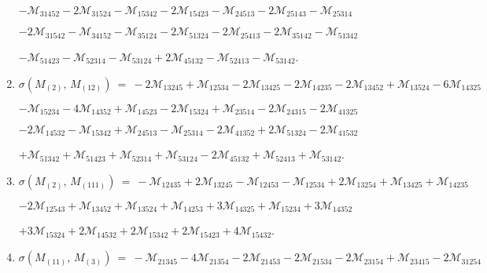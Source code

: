 \documentclass[12pt]{article}
\newcommand{\M}{\mathcal{M}}
\begin{document}
\begin{enumerate}
      \hspace{10pt}
      $-\M_{31452} 
       -2\M_{31524} -\M_{15342} 
       -2\M_{15423} -\M_{24513} 
       -2\M_{25143} -\M_{25314} $\vspace{-6pt}

      \hspace{10pt}
      $-2\M_{31542} -\M_{34152} 
       -\M_{35124} -2\M_{51324} 
       -2\M_{25413} -2\M_{35142} 
       -\M_{51342} $\vspace{-6pt}

      \hspace{10pt}
      $-\M_{51423} 
       -\M_{52314} -\M_{53124} 
       +2\M_{45132} -\M_{52413} 
       -\M_{53142} $.\vspace{-8pt}
\item[]\hspace{-50pt}$\sigma(M_{(2)},\,M_{(12)})\ =\ 
        -2\M_{13245} +\M_{12534} 
       -2\M_{13425} -2\M_{14235} 
       -2\M_{13452} +\M_{13524} 
       -6\M_{14325} $\vspace{-6pt}

      \hspace{10pt}
      $-\M_{15234} 
       -4\M_{14352} +\M_{14523} 
       -2\M_{15324} +\M_{23514} 
       -2\M_{24315} -2\M_{41325} $\vspace{-6pt}

      \hspace{10pt}
      $-2\M_{14532} -\M_{15342} 
       +\M_{24513} -\M_{25314} 
       -2\M_{41352} +2\M_{51324} 
       -2\M_{41532} $\vspace{-6pt}

      \hspace{10pt}
      $+\M_{51342} 
       +\M_{51423} +\M_{52314} 
       +\M_{53124} -2\M_{45132} 
       +\M_{52413} +\M_{53142} $.\vspace{-8pt}
\item[]\hspace{-50pt}$\sigma(M_{(2)},\,M_{(111)})\ =\ 
        -\M_{12435} +2\M_{13245} 
       -\M_{12453} -\M_{12534} 
       +2\M_{13254} +\M_{13425} 
       +\M_{14235} $\vspace{-6pt}

      \hspace{10pt}
      $-2\M_{12543} 
       +\M_{13452} +\M_{13524} 
       +\M_{14253} +3\M_{14325} 
       +\M_{15234} +3\M_{14352} $\vspace{-6pt}

      \hspace{10pt}
      $+3\M_{15324} +2\M_{14532} 
       +2\M_{15342} +2\M_{15423} 
       +4\M_{15432} $.\vspace{-8pt}
\item[]\hspace{-50pt}$\sigma(M_{(11)},\,M_{(3)})\ =\ 
        -\M_{21345} -4\M_{21354} 
       -2\M_{21453} -2\M_{21534} 
       -2\M_{23154} +\M_{23415} 
       -2\M_{31254} $\vspace{-6pt}


\end{enumerate}
\end{document}
